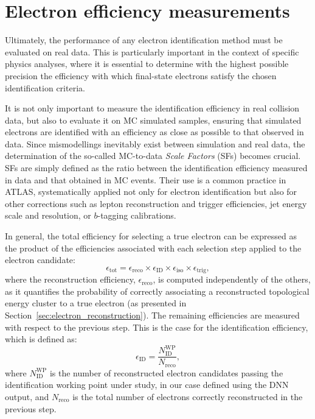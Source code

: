 \section{Electron efficiency measurements}
\label{sec:electron_efficiency_measurements}

Ultimately, the performance of any electron identification method must be evaluated on real data. This is particularly important in the context of specific physics analyses, where it is essential to determine with the highest possible precision the efficiency with which final-state electrons satisfy the chosen identification criteria.

It is not only important to measure the identification efficiency in real collision data, but also to evaluate it on MC simulated samples, ensuring that simulated electrons are identified with an efficiency as close as possible to that observed in data. Since mismodellings inevitably exist between simulation and real data, the determination of the so-called MC-to-data \emph{Scale Factors} (SFs) becomes crucial. SFs are simply defined as the ratio between the identification efficiency measured in data and that obtained in MC events. Their use is a common practice in ATLAS, systematically applied not only for electron identification but also for other corrections such as lepton reconstruction and trigger efficiencies, jet energy scale and resolution, or $b$-tagging calibrations.

In general, the total efficiency for selecting a true electron can be expressed as the product of the efficiencies associated with each selection step applied to the electron candidate:
\begin{equation}
  \epsilon_{\text{tot}} = \epsilon_{\text{reco}} \times \epsilon_{\text{ID}} \times \epsilon_{\text{iso}} \times \epsilon_{\text{trig}},
\end{equation}
where the reconstruction efficiency, $\epsilon_{\text{reco}}$, is computed independently of the others, as it quantifies the probability of correctly associating a reconstructed topological energy cluster to a true electron (as presented in Section~\ref{sec:electron_reconstruction}). The remaining efficiencies are measured with respect to the previous step. This is the case for the identification efficiency, which is defined as:
\begin{equation}
  \epsilon_{\text{ID}} = \frac{N^{\text{WP}}_{\text{ID}}}{N_{\text{reco}}},
\label{eq:id_eff}  
\end{equation}
where $N^{\text{WP}}_{\text{ID}}$ is the number of reconstructed electron candidates passing the identification working point under study, in our case defined using the DNN output, and $N_{\text{reco}}$ is the total number of electrons correctly reconstructed in the previous step.


